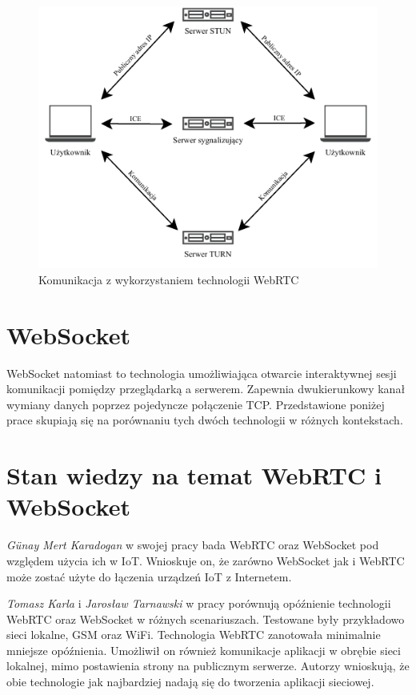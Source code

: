 \documentclass[language=polish,type=master]{aghmodern}
\begin{document}
\begin{figure}[H]
    \centering
    \vspace*{15pt}
    \includegraphics[width=\textwidth]{images/webrtc.pdf}
    \caption{Komunikacja z wykorzystaniem technologii WebRTC}
    \label{fig:webrtc}
\end{figure}

\section{WebSocket}
WebSocket natomiast to technologia umożliwiająca otwarcie interaktywnej sesji komunikacji pomiędzy przeglądarką a serwerem.
Zapewnia dwukierunkowy kanał wymiany danych poprzez pojedyncze połączenie TCP.
Przedstawione poniżej prace skupiają się na porównaniu tych dwóch technologii w różnych kontekstach.

\section{Stan wiedzy na temat WebRTC i WebSocket}
\emph{G{\"u}nay Mert Karadogan} w swojej pracy \cite{websocket_webrtc_iot} bada WebRTC oraz WebSocket pod względem użycia ich w IoT\footnotemark{}.
Wnioskuje on, że zarówno WebSocket jak i WebRTC może zostać użyte do łączenia urządzeń IoT z Internetem.

\emph{Tomasz Karla} i \emph{Jarosław Tarnawski} w pracy \cite{websocket_webrtc_realtime} porównują opóźnienie technologii WebRTC oraz WebSocket w różnych scenariuszach.
Testowane były przykładowo sieci lokalne, GSM oraz WiFi. Technologia WebRTC zanotowała minimalnie mniejsze opóźnienia.
Umożliwił on również komunikacje aplikacji w obrębie sieci lokalnej\footnotemark{}, mimo postawienia strony na publicznym serwerze.
Autorzy wnioskują, że obie technologie jak najbardziej nadają się do tworzenia aplikacji sieciowej.
\end{document}
